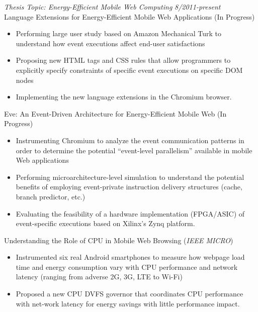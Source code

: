 \documentclass[margin, 9pt]{res} %
\begin{document}
\begin{resume}
\vspace*{-7pt}
{\large\textit{Thesis Topic: Energy-Efficient Mobile Web Computing}} \hfill\textit{8/2011-present}\\

\vspace*{-7pt}
Language Extensions for Energy-Efficient Mobile Web Applications \hfill(In Progress)\\
\vspace*{-10pt}
\begin{itemize}[leftmargin=*] \itemsep -3pt
\vspace*{-5pt}
	\item Performing large user study based on Amazon Mechanical Turk to understand how event executions affect end-user satisfactions
	\item Proposing new HTML tags and CSS rules that allow programmers to explicitly specify constraints of specific event executions on specific DOM nodes
	\item Implementing the new language extensions in the Chromium browser.
\end{itemize}

\medskip
Eve: An Event-Driven Architecture for Energy-Efficient Mobile Web \hfill(In Progress)\\
\vspace*{-10pt}
\begin{itemize}[leftmargin=*] \itemsep -3pt
\vspace*{-5pt}
	\item Instrumenting Chromium to analyze the event communication patterns in order to determine the potential ``event-level parallelism'' available in mobile Web applications
	\item Performing microarchitecture-level simulation to understand the potential benefits of employing event-private instruction delivery structures (cache, branch predictor, etc.)
	\item Evaluating the feasibility of a hardware implementation (FPGA/ASIC) of event-specific executions based on Xilinx's Zynq platform.
\end{itemize}

\medskip
Understanding the Role of CPU in Mobile Web Browsing \hfill(\textit{IEEE MICRO})\\
\vspace*{-10pt}
\begin{itemize}[leftmargin=*] \itemsep -3pt
\vspace*{-5pt}
	\item Instrumented six real Android smartphones to measure how webpage load time and energy consumption vary with CPU performance and network latency (ranging from adverse 2G, 3G, LTE to Wi-Fi)
	\item Proposed a new CPU DVFS governor that coordinates CPU performance with net-work latency for energy savings with little performance impact.
\end{itemize}


\end{resume}
\end{document}
